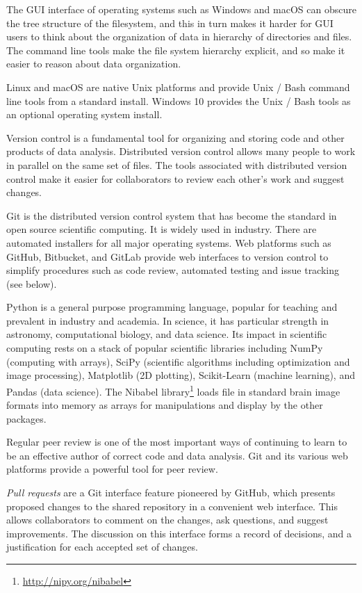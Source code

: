 The GUI interface of operating systems such as Windows and macOS can obscure
the tree structure of the filesystem, and this in turn makes it harder for GUI
users to think about the organization of data in hierarchy of directories and
files.  The command line tools make the file system hierarchy explicit, and so
make it easier to reason about data organization.

Linux and macOS are native Unix platforms and provide Unix / Bash command line
tools from a standard install.  Windows 10 provides the Unix / Bash tools as
an optional operating system install.

Version control is a fundamental tool for organizing and storing code and
other products of data analysis.
Distributed version control allows many people to work in parallel on the
same set of files.
The tools associated with distributed version control make it easier for
collaborators to review each other's work and suggest changes.

Git is the distributed version control system that has become the standard in
open source scientific computing. It is widely used in industry.
There are automated installers for all major operating systems.
Web platforms such as GitHub, Bitbucket, and GitLab provide web interfaces
to version control to simplify procedures such as code review, automated
testing and issue tracking (see below).

Python is a general purpose programming language,
popular for teaching and prevalent in industry and academia.
In science, it has particular strength in
astronomy, computational biology, and data science.
Its impact in scientific computing rests on a stack of popular scientific
libraries including NumPy (computing with arrays), SciPy (scientific
algorithms including optimization and image processing), Matplotlib (2D
plotting), Scikit-Learn (machine learning), and Pandas (data science).  The
Nibabel library\footnote{\url{http://nipy.org/nibabel}\label{nibabel}} loads
file in standard brain image formats into memory as arrays for manipulations
and display by the other packages.

Regular peer review is one of the most important ways of continuing to learn
to be an effective author of correct code and data analysis.  Git and its
various web platforms provide a powerful tool for peer review.

\emph{Pull requests} are a Git interface feature pioneered by GitHub, which
presents proposed changes to the shared repository in a convenient web
interface. This allows collaborators to comment on the changes, ask questions,
and suggest improvements.  The discussion on this interface forms a record of
decisions, and a justification for each accepted set of changes.

